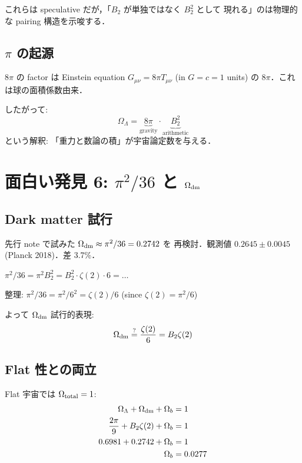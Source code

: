 \documentclass[11pt,a4paper]{article}
\begin{document}
これらは speculative だが，「$B_2$ が単独ではなく $B_2^2$ として
現れる」のは物理的な pairing 構造を示唆する．

\subsection{$\pi$ の起源}

$8\pi$ の factor は Einstein equation $G_{\mu\nu} = 8\pi T_{\mu\nu}$
(in $G=c=1$ units) の $8\pi$．これは球の面積係数由来．

したがって:
\begin{equation}
\Omega_\Lambda = \underbrace{8\pi}_{\text{gravity}}\cdot\underbrace{B_2^2}_{\text{arithmetic}}
\end{equation}
という解釈: 「重力と数論の積」が宇宙論定数を与える．

\section{面白い発見 6: $\pi^2/36$ と $\Omega_{\rm dm}$}

\subsection{Dark matter 試行}

先行 note で試みた $\Omega_{\rm dm} \approx \pi^2/36 = 0.2742$ を
再検討．観測値 $0.2645 \pm 0.0045$ (Planck 2018)．差 3.7\%．

$\pi^2/36 = \pi^2 B_2^2 = B_2^2 \cdot \zeta(2)\cdot 6 = \ldots$

整理: $\pi^2/36 = \pi^2/6^2 = \zeta(2)/6$ (since $\zeta(2) = \pi^2/6$)

よって $\Omega_{\rm dm}$ 試行的表現:
\begin{equation}
\Omega_{\rm dm} \stackrel{?}{=} \frac{\zeta(2)}{6} = B_2 \zeta(2)
\end{equation}

\subsection{Flat 性との両立}

Flat 宇宙では $\Omega_{\rm total} = 1$:
\begin{align}
\Omega_\Lambda + \Omega_{\rm dm} + \Omega_b &= 1\\
\frac{2\pi}{9} + B_2 \zeta(2) + \Omega_b &= 1\\
0.6981 + 0.2742 + \Omega_b &= 1\\
\Omega_b &= 0.0277
\end{align}
\end{document}
